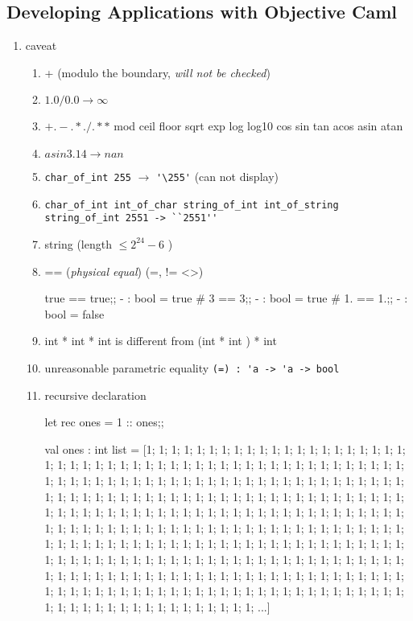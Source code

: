 \subsection{Developing Applications with Objective Caml}

\begin{enumerate}
  \item caveat
    \begin{enumerate}
    \item + (modulo the boundary, \emph{will not be checked})
    \item $1.0/0.0 \rightarrow \infty $
    \item $+. -. *. /. **$  mod ceil floor sqrt exp log log10 cos sin tan acos asin atan  
    \item $asin 3.14  \rightarrow nan    $
    \item \verb|char_of_int 255| $\rightarrow$ \verb|'\255'| (can not display)
    \item \verb|char_of_int int_of_char string_of_int int_of_string|
      \verb|string_of_int 2551 -> ``2551''|
    \item string (length $\le 2^{24} - 6$ )
    \item == (\textit{physical equal}) (=, != <>)


\begin{alternate}
true == true;;
- : bool = true
# 3 == 3;;
- : bool = true
# 1. == 1.;;
- : bool = false
\end{alternate}

    \item int * int * int is different from (int * int ) * int
    \item unreasonable parametric equality \verb|(=) : 'a -> 'a -> bool|
    \item recursive declaration

\begin{ocamlcode}
let rec ones = 1 :: ones;;
\end{ocamlcode}

\begin{ocamlcode}
val ones : int list =
  [1; 1; 1; 1; 1; 1; 1; 1; 1; 1; 1; 1; 1; 1; 1; 1; 1; 1; 1; 1; 1; 1; 1; 1; 1;
   1; 1; 1; 1; 1; 1; 1; 1; 1; 1; 1; 1; 1; 1; 1; 1; 1; 1; 1; 1; 1; 1; 1; 1; 1;
   1; 1; 1; 1; 1; 1; 1; 1; 1; 1; 1; 1; 1; 1; 1; 1; 1; 1; 1; 1; 1; 1; 1; 1; 1;
   1; 1; 1; 1; 1; 1; 1; 1; 1; 1; 1; 1; 1; 1; 1; 1; 1; 1; 1; 1; 1; 1; 1; 1; 1;
   1; 1; 1; 1; 1; 1; 1; 1; 1; 1; 1; 1; 1; 1; 1; 1; 1; 1; 1; 1; 1; 1; 1; 1; 1;
   1; 1; 1; 1; 1; 1; 1; 1; 1; 1; 1; 1; 1; 1; 1; 1; 1; 1; 1; 1; 1; 1; 1; 1; 1;
   1; 1; 1; 1; 1; 1; 1; 1; 1; 1; 1; 1; 1; 1; 1; 1; 1; 1; 1; 1; 1; 1; 1; 1; 1;
   1; 1; 1; 1; 1; 1; 1; 1; 1; 1; 1; 1; 1; 1; 1; 1; 1; 1; 1; 1; 1; 1; 1; 1; 1;
   1; 1; 1; 1; 1; 1; 1; 1; 1; 1; 1; 1; 1; 1; 1; 1; 1; 1; 1; 1; 1; 1; 1; 1; 1;
   1; 1; 1; 1; 1; 1; 1; 1; 1; 1; 1; 1; 1; 1; 1; 1; 1; 1; 1; 1; 1; 1; 1; 1; 1;
   1; 1; 1; 1; 1; 1; 1; 1; 1; 1; 1; 1; 1; 1; 1; 1; 1; 1; 1; 1; 1; 1; 1; 1; 1;
   1; 1; 1; 1; 1; 1; 1; 1; 1; 1; 1; 1; 1; 1; 1; 1; 1; 1; 1; 1; 1; 1; 1; 1;
   ...]
\end{ocamlcode}



\end{enumerate}
\end{enumerate}
